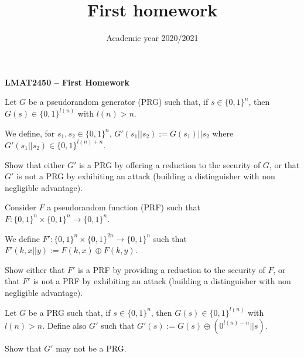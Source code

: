 \documentclass[12pt, answers]{exam}
\title{First homework}
\date{Academic year 2020/2021}
\begin{document}
\begin{center}
\Large \bfseries
LMAT2450 -- First Homework\\
\smallskip
\end{center}

\begin{questions}

	Let $G$ be a pseudorandom generator (PRG) such that, if $s\in\{0,1\}^n$, then $G(s)\in\{0,1\}^{l(n)}$ with $l(n)>n$.
	
	We define, for $s_1,s_2\in\{0,1\}^n$, $G'(s_1||s_2):=G(s_1)||s_2$ where $G'(s_1||s_2)\in \{0,1\}^{l(n)+n}$.
	
	Show that either $G'$ is a PRG by offering a reduction to the
        security of $G$, or that $G'$ is not a PRG by exhibiting an
        attack (building a distinguisher with non negligible
        advantage).
	
\begin{solutionbox}{15cm}
\end{solutionbox}  

\newpage

Consider $F$ a pseudorandom function (PRF) such that $F:\{0,1\}^n\times \{0,1\}^n \longrightarrow \{0,1\}^n$.

We define $F':\{0,1\}^n\times \{0,1\}^{2n} \longrightarrow \{0,1\}^n$ such that $F'(k, x||y):= F(k,x)\oplus F(k,y)$.

Show either that $F'$ is a PRF by providing a reduction to the security of $F$, or that $F'$ is not a PRF by exhibiting an attack (building a distinguisher with non negligible advantage).

\begin{solutionbox}{15cm}
\end{solutionbox}  

\newpage


Let $G$ be a PRG such that, if $s\in\{0,1\}^n$, then $G(s)\in\{0,1\}^{l(n)}$ with $l(n)>n$.
Define also $G'$ such that $G'(s):= G(s)\oplus(0^{l(n)-n}||s)$.

Show that $G'$ may not be a PRG.
\begin{solutionbox}{15cm}
\end{solutionbox}

\end{questions}

  
\end{document}
